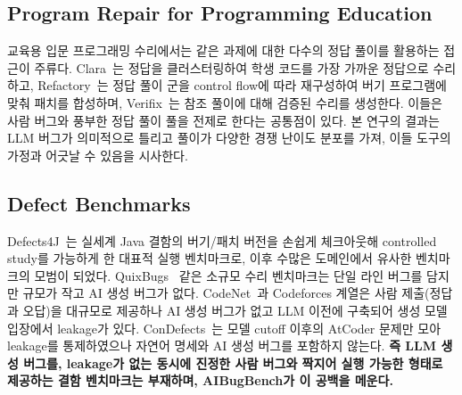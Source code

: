\documentclass[10pt,conference]{IEEEtran}
\begin{document}
\subsection{Program Repair for Programming Education}
교육용 입문 프로그래밍 수리에서는 같은 과제에 대한 다수의 정답 풀이를 활용하는 접근이 주류다. Clara~\cite{gulwani2018clara}는 정답을 클러스터링하여 학생 코드를 가장 가까운 정답으로 수리하고, Refactory~\cite{hu2019refactory}는 정답 풀이 군을 control flow에 따라 재구성하여 버기 프로그램에 맞춰 패치를 합성하며, Verifix~\cite{ahmed2022verifix}는 참조 풀이에 대해 검증된 수리를 생성한다. 이들은 사람 버그와 풍부한 정답 풀이 풀을 전제로 한다는 공통점이 있다. 본 연구의 결과는 LLM 버그가 의미적으로 틀리고 풀이가 다양한 경쟁 난이도 분포를 가져, 이들 도구의 가정과 어긋날 수 있음을 시사한다.

\subsection{Defect Benchmarks}
Defects4J~\cite{just2014defects4j}는 실세계 Java 결함의 버기/패치 버전을 손쉽게 체크아웃해 controlled study를 가능하게 한 대표적 실행 벤치마크로, 이후 수많은 도메인에서 유사한 벤치마크의 모범이 되었다. QuixBugs~\cite{lin2017quixbugs} 같은 소규모 수리 벤치마크는 단일 라인 버그를 담지만 규모가 작고 AI 생성 버그가 없다. CodeNet~\cite{puri2021codenet}과 Codeforces 계열은 사람 제출(정답과 오답)을 대규모로 제공하나 AI 생성 버그가 없고 LLM 이전에 구축되어 생성 모델 입장에서 leakage가 있다. ConDefects~\cite{wu2023condefects}는 모델 cutoff 이후의 AtCoder 문제만 모아 leakage를 통제하였으나 자연어 명세와 AI 생성 버그를 포함하지 않는다. \textbf{즉 LLM 생성 버그를, leakage가 없는 동시에 진정한 사람 버그와 짝지어 실행 가능한 형태로 제공하는 결함 벤치마크는 부재하며, AIBugBench가 이 공백을 메운다.}
\end{document}
